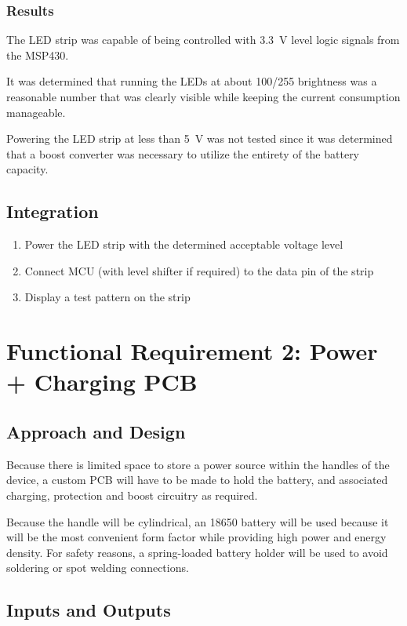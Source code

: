 \documentclass{notes}
\begin{document}
\subsubsection{Results}

The LED strip was capable of being controlled with \SI{3.3}{\volt} level logic signals from the MSP430.

It was determined that running the LEDs at about 100/255 brightness was a reasonable number that was clearly visible while keeping the current consumption manageable.

Powering the LED strip at less than \SI{5}{\volt} was not tested since it was determined that a boost converter was necessary to utilize the entirety of the battery capacity.

\subsection{Integration}
\begin{enumerate}
    \item Power the LED strip with the determined acceptable voltage level
    \item Connect MCU (with level shifter if required) to the data pin of the strip
    \item Display a test pattern on the strip
\end{enumerate}

\section{Functional Requirement 2: Power + Charging PCB}
\label{sec:fr2}

\subsection{Approach and Design}

Because there is limited space to store a power source within the handles of the device, a custom PCB will have to be made to hold the battery, and associated charging, protection and boost circuitry as required.

Because the handle will be cylindrical, an 18650 battery will be used because it will be the most convenient form factor while providing high power and energy density.
For safety reasons, a spring-loaded battery holder will be used to avoid soldering or spot welding connections.

\subsection{Inputs and Outputs}
\end{document}
